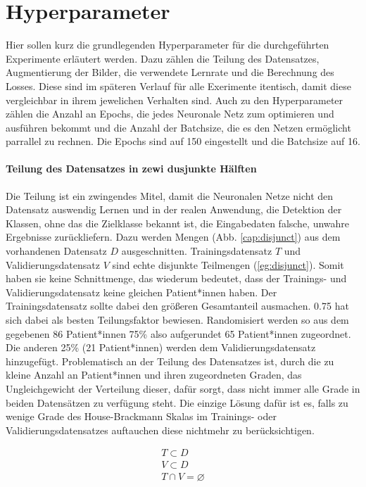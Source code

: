 \section{Hyperparameter}\label{hyper}
Hier sollen kurz die grundlegenden Hyperparameter für die durchgeführten Experimente erläutert werden. Dazu zählen die Teilung des Datensatzes, Augmentierung der Bilder, die verwendete Lernrate und die Berechnung des Losses. Diese sind im späteren Verlauf für alle Exerimente itentisch, damit diese vergleichbar in ihrem jewelichen Verhalten sind. Auch zu den Hyperparameter zählen die Anzahl an Epochs, die jedes Neuronale Netz zum optimieren und ausführen bekommt und die Anzahl der Batchsize, die es den Netzen ermöglicht parrallel zu rechnen. Die Epochs sind auf 150 eingestellt und die Batchsize auf 16.

\paragraph{Teilung des Datensatzes in zewi dusjunkte Hälften} Die Teilung ist ein zwingendes Mitel, damit die Neuronalen Netze nicht den Datensatz auswendig Lernen und in der realen Anwendung, die Detektion der Klassen, ohne das die Zielklasse bekannt ist, die Eingabedaten falsche, unwahre Ergebnisse zurückliefern. Dazu werden Mengen (Abb. \ref{cap:disjunct}) aus dem vorhandenen Datensatz $D$ ausgeschnitten. Trainingsdatensatz $T$ und Validierungsdatensatz $V$ sind echte disjunkte Teilmengen (\ref{eg:disjunct}). Somit haben sie keine Schnittmenge, das wiederum bedeutet, dass der Trainings- und Validierungsdatensatz keine gleichen Patient*innen haben. Der Trainingsdatensatz sollte dabei den größeren Gesamtanteil ausmachen. 0.75 hat sich  dabei als besten Teilungsfaktor bewiesen. Randomisiert werden so aus dem gegebenen 86 Patient*innen 75\% also aufgerundet 65 Patient*innen zugeordnet. Die anderen 25\% (21 Patient*innen) werden dem Validierungsdatensatz hinzugefügt. Problematisch an der Teilung des Datensatzes ist, durch die zu kleine Anzahl an Patient*innen und ihren zugeordneten Graden, das Ungleichgewicht der Verteilung dieser, dafür sorgt, dass nicht immer alle Grade in beiden Datensätzen zu verfügung steht. Die einzige Lösung dafür ist es, falls zu wenige Grade des House-Brackmann Skalas im Trainings- oder Validierungsdatensatzes auftauchen diese nichtmehr zu berücksichtigen.

\begin{equation}
\begin{split}
  T \subset D \\
  V \subset D \\
  T \cap V  = \varnothing
\end{split}
\label{eg:disjunct}
\end{equation}


